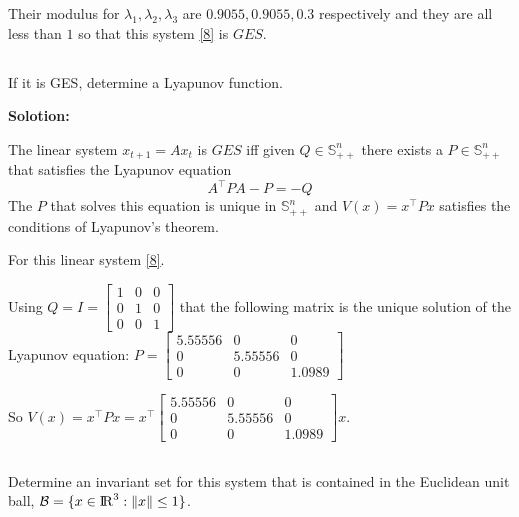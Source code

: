 \documentclass[a4paper,11pt,reqno]{amsart}
\newcommand{\R}{{\rm I\!R}}
\newcommand{\tran}{\intercal}
\begin{document}
Their modulus for $\lambda_1,\lambda_2,\lambda_3$ are $0.9055,0.9055,0.3$ respectively and they are
all less than $1$ so that this system \ref{8} is $GES$.
\subsection{}
If it is GES, determine a Lyapunov function.

\textbf{Solotion:}

The linear system $x_{t+1} = Ax_t$ is $GES$ iff given $Q \in \mathbb{S}^n_{++}$ there exists a
$P \in \mathbb{S}^n_{++}$ that satisfies the Lyapunov equation
\begin{equation}
    A^{\tran}PA-P = -Q
    \label{9}
\end{equation}
The $P$ that solves this equation is unique in $\mathbb{S}^n_{++}$ and $V(x)=x^{\tran}Px$ satisfies the
conditions of Lyapunov's theorem.

For this linear system \ref{8}.

Using $Q = I = \begin{bmatrix} 1 & 0 & 0 \\ 0 & 1 & 0 \\ 0 & 0 & 1 \end{bmatrix}$ 
that the following matrix is the unique solution of the Lyapunov equation:
$P = \begin{bmatrix} 5.55556 & 0 & 0 \\ 0 & 5.55556 & 0 \\ 0 & 0 & 1.0989 \end{bmatrix}$

So $V(x) = x^{\tran}Px = x^{\tran}\begin{bmatrix} 5.55556 & 0 & 0 \\ 0 & 5.55556 & 0 \\ 0 & 0 & 1.0989 \end{bmatrix}x$.

\subsection{}
Determine an invariant set for this system that is contained in the Euclidean unit ball,
$\mathcal{B} = \{x \in \R^3:\|x\| \leq 1\}$.
\end{document}
